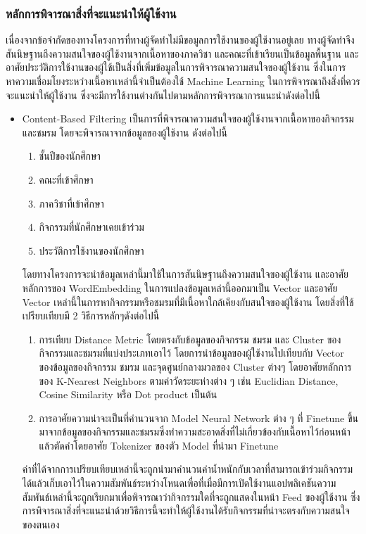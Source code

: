 \documentclass[14pt,oneside,openright,a4paper]{cpe-thai-project}
\begin{document}
  \subsubsection{หลักการพิจารณาสิ่งที่จะแนะนําให้ผู้ใช้งาน}
    เนื่องจากข้อจำกัดของทางโครงการที่ทางผู้จัดทำไม่มีขอมูลการใช้งานของผู้ใช้งานอยู่เลย ทางผู้จัดทำจึงสันนิษฐานถึงความสนใจของผู้ใช้งานจากเนื้อหาของภาควิชา และคณะที่เข้าเรียนเป็นข้อมูลพื้นฐาน และอาศัยประวัติการใช้งานของผู้ใช้เป็นสิ่งที่เพิ่มข้อมูลในการพิจารณาความสนใจของผู้ใช้งาน ซึ่งในการหาความเชื่อมโยงระหว่างเนื้อหาเหล่านี้จำเป็นต้องใช้ Machine Learning ในการพิจารณาถึงสิ่งที่ควรจะแนะนำให้ผู้ใช้งาน ซึ่งจะมีการใช้งานต่างกันไปตามหลักการพิจารณาการแนะนำดังต่อไปนี้
    \begin{itemize}
    \item Content-Based Filtering เป็นการที่พิจารณาความสนใจของผู้ใช้งานจากเนื้อหาของกิจกรรมและชมรม โดยจะพิจารณาจากข้อมูลของผู้ใช้งาน ดังต่อไปนี้
      \begin{enumerate}
        \item ชั้นปีของนักศึกษา
        \item คณะที่เข้าศึกษา
        \item ภาควิชาที่เข้าศึกษา
        \item กิจกรรมที่นักศึกษาเคยเข้าร่วม
        \item ประวัติการใช้งานของนักศึกษา
      \end{enumerate}
      โดยทางโครงการจะนำข้อมูลเหล่านี้มาใช้ในการสันนิษฐานถึงความสนใจของผู้ใช้งาน และอาศัยหลักการของ WordEmbedding ในการแปลงข้อมูลเหล่านี้ออกมาเป็น Vector และอาศัย Vector เหล่านี้ในการหากิจกรรมหรือชมรมที่มีเนื้อหาใกล้เคียงกับสนใจของผู้ใช้งาน โดยสิ่งที่ใช้เปรียบเทียบมี 2 วิธีการหลักๆดังต่อไปนี้
      \begin{enumerate}
        \item การเทียบ Distance Metric โดยตรงกับข้อมูลของกิจกรรม ชมรม และ Cluster ของกิจกรรมและชมรมที่แบ่งประเภทเอาไว้ โดยการนำข้อมูลของผู้ใช้งานไปเทียบกับ Vector ของข้อมูลของกิจกรรม ชมรม และจุดศูนย์กลางมวลของ Cluster ต่างๆ โดยอาศัยหลักการของ K-Nearest Neighbors ตามค่าวัดระยะห่างต่าง ๆ เช่น Euclidian Distance, Cosine Similarity หรือ Dot product เป็นต้น  
        \item การอาศัยความน่าจะเป็นที่คำนวนจาก Model Neural Network ต่าง ๆ ที่ Finetune ขึ้นมาจากข้อมูลของกิจกรรมและชมรมซึ่งทำความสะอาดสิ่งที่ไม่เกี่ยวข้องกับเนื้อหาไว้ก่อนหน้าแล้วตัดคำโดยอาศัย Tokenizer ของตัว Model ที่นำมา Finetune 
      \end{enumerate}
        ค่าที่ได้จากการเปรียบเทียบเหล่านี้จะถูกนำมาคำนวนค่าน้ำหนักกับเวลาที่สามารถเข้าร่วมกิจกรรมได้แล้วเก็บเอาไว้ในความสัมพันธ์ระหว่างโหนดเพื่อที่เมื่อมีการเปิดใช้งานแอปพลิเคชันความสัมพันธ์เหล่านี้จะถูกเรียกมาเพื่อพิจารณาว่ากิจกรรมใดที่จะถูกแสดงในหน้า Feed ของผู้ใช้งาน ซึ่งการพิจารณาสิ่งที่จะแนะนำด้วยวิธีการนี้จะทำให้ผู้ใช้งานได้รับกิจกรรมที่น่าจะตรงกับความสนใจของตนเอง

\end{itemize}
\end{document}
